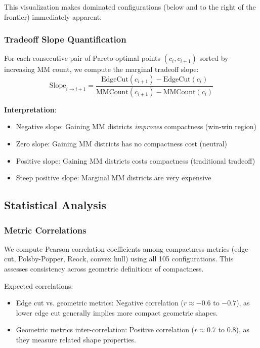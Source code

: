 This visualization makes dominated configurations (below and to the right of the frontier) immediately apparent.

\subsubsection{Tradeoff Slope Quantification}

For each consecutive pair of Pareto-optimal points $(c_i, c_{i+1})$ sorted by increasing MM count, we compute the marginal tradeoff slope:
\[
\text{Slope}_{i \to i+1} = \frac{\text{EdgeCut}(c_{i+1}) - \text{EdgeCut}(c_i)}{\text{MMCount}(c_{i+1}) - \text{MMCount}(c_i)}
\]

\textbf{Interpretation}:
\begin{itemize}
    \item Negative slope: Gaining MM districts \emph{improves} compactness (win-win region)
    \item Zero slope: Gaining MM districts has no compactness cost (neutral)
    \item Positive slope: Gaining MM districts costs compactness (traditional tradeoff)
    \item Steep positive slope: Marginal MM districts are very expensive
\end{itemize}

\subsection{Statistical Analysis}

\subsubsection{Metric Correlations}

We compute Pearson correlation coefficients among compactness metrics (edge cut, Polsby-Popper, Reock, convex hull) using all 105 configurations. This assesses consistency across geometric definitions of compactness.

Expected correlations:
\begin{itemize}
    \item Edge cut vs. geometric metrics: Negative correlation ($r \approx -0.6$ to $-0.7$), as lower edge cut generally implies more compact geometric shapes.
    \item Geometric metrics inter-correlation: Positive correlation ($r \approx 0.7$ to $0.8$), as they measure related shape properties.
\end{itemize}

